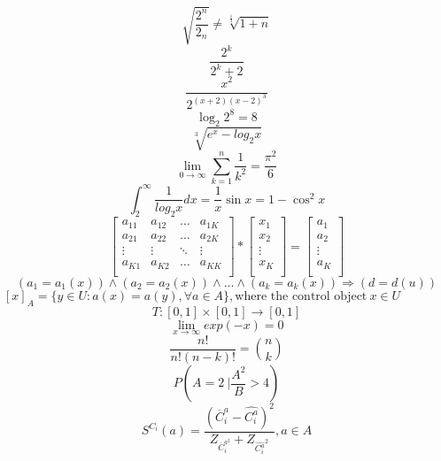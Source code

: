 \documentclass[a4paper,11pt]{article}
\begin{document}
\begin{equation}
\sqrt{ \frac{2^{n}}{2_n}} \neq \sqrt[\frac{1}{3}]{1+n}
\end{equation}
\begin{equation}
\frac{2^{k}}{2^k+2}
\end{equation}
\begin{equation}
\frac{x^{2}}{2^{(x+2)(x-2)^3}}
\end{equation}
\begin{equation}
\log_{2} 2^8 = 8
\end{equation}
\begin{equation}
\sqrt[3]{e^x-log_{2} x}
\end{equation}
\begin{equation}
\lim_{0\to\infty}\sum_{k=1}^{n}\frac{1}{k^2} = \frac{\pi^2}{6}
\end{equation}
\begin{equation}
\int_{2}^{\infty}\frac{1}{log_{2} x}dx = \frac{1}{x}\sin{x} = 1 - \cos^2{x}
\end{equation}
\begin{equation}
\left[ \begin{array}{cccc}
a_{11} & a_{12} & \ldots & a_{1K} \\
a_{21} & a_{22} & \ldots & a_{2K} \\
\vdots & \vdots & \ddots & \vdots \\
a_{K1} & a_{K2} & \ldots & a_{KK} \\
\end{array} \right]
*
\left[\begin{array}{c}
x_{1} \\
x_{2} \\
\vdots \\
x_{K}  \\
\end{array}\right]
=
\left[\begin{array}{c}
a_{1} \\
a_{2} \\
\vdots \\
a_{K}  \\
\end{array}\right]
\end{equation}
\begin{equation}
(a_1 = a_1(x))\wedge (a_2 = a_2(x))\wedge ... \wedge (a_k = a_k(x)) \Rightarrow (d = d(u))
\end{equation}
$[x]_A = \{ y \in U : a(x) = a(y), \forall a \in A \}, \textrm{where the control object} \ x \in U$
\begin{equation}
T : [0,1] \times [0,1] \to [0,1]
\end{equation}
\begin{equation}
\lim_{x\to\infty}exp(-x) = 0
\end{equation}
\begin{equation}
\frac{n!}{n!(n-k)!} = {n\choose k}
\end{equation}
\begin{equation}
 P \left(A=2\ \bigg|\frac{A^2}{B} > 4 \right)
\end{equation}
\begin{equation}
S^{C_i}(a) = \frac{(\overline{C}^a_i - \hat{C^a_i})^2}{Z_{\overline{C}^{a^2}_i} + Z_{\hat{C^a_i}^2}}, a \in A
\end{equation}
\end{document}
